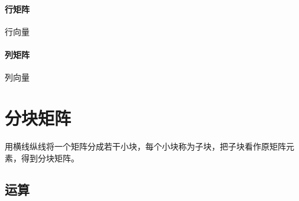 \paragraph{行矩阵}
行向量


\paragraph{列矩阵}
列向量


\section{分块矩阵}

用横线纵线将一个矩阵分成若干小块，每个小块称为子块，把子块看作原矩阵元素，得到分块矩阵。

\subsection{运算}

